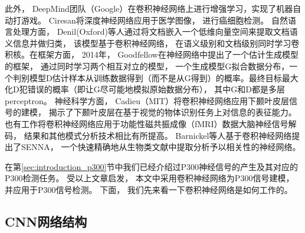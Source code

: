 此外， DeepMind团队（Google）\cite{mnih2013playing}在卷积神经网络上进行增强学习，实现了机器自动打游戏。 Ciresan\cite{cirecsan2013mitosis}将深度神经网络应用于医学图像， 进行癌细胞检测。  自然语言处理方面， Denil(Oxford)等人通过将文档嵌入一个低维向量空间来提取文档语义信息并做归类，  该模型基于卷积神经网络， 在语义级别和文档级别同时学习卷积核。在框架方面， 2014年， Goodfellow在神经网络中提出了一个估计生成模型的框架\cite{goodfellow2014generative}， 通过同时学习两个相互对立的模型， 一个生成模型G拟合数据分布，一个判别模型D估计样本从训练数据得到（而不是从G得到）的概率。最终目标最大化D犯错误的概率（即让G尽可能地模拟原始数据分布）， 其中G和D都是多层perceptron。 神经科学方面， Cadieu（MIT）将卷积神经网络应用下颞叶皮层信号的建模\cite{cadieu2014deep}， 揭示了下颞叶皮层在基于视觉的物体识别任务上对信息的表征能力。 也有工作将卷积神经网络应用于功能性磁共振成像（fMRI）数据大脑神经信号解码\cite{firat2014learning}， 结果和其他模式分析技术相比有所提高。 Barnickel等人基于卷积神经网络提出了SENNA， 一个快速精确地从生物类文献中提取分析予以相关性的神经网络\cite{barnickel2009large}。 

在第\ref{sec:introduction_p300}节中我们已经介绍过P300神经信号的产生及其对应的P300检测任务。 受以上文章启发， 本文中采用卷积神经网络为P300信号建模， 并应用于P300信号检测。 下面， 我们先来看一下卷积神经网络是如何工作的。


\subsection{CNN网络结构}\label{sec:cnn_arch}

